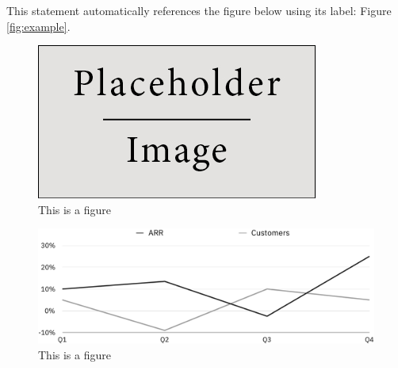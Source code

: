 \documentclass[12pt,a4paper]{article} %
\begin{document}
This statement automatically references the figure below using its label: Figure \ref{fig:example}.

\begin{figure}[h]
    \centering
    \includegraphics[width=\textwidth]{Images/placeholder.jpg}
    \caption{This is a figure}
\end{figure}



\begin{figure}[h]
    \centering
    \includegraphics[width=\textwidth]{Images/ARR.pdf}
    \caption{This is a figure}
\end{figure}


\end{document}
